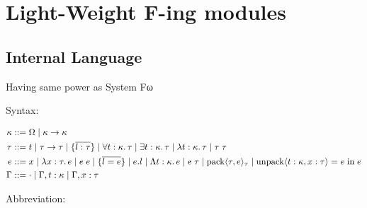 \section{Light-Weight F-ing modules}

\cite{Rossberg:2014}

\subsection{Internal Language}

Having same power as System Fω

Syntax:

\begin{align*}
  \kappa
  &\mathrel{::=} \Omega \mid \kappa \to \kappa
  \\
  \tau
  &\mathrel{::=} t
  \mid \tau \to \tau
  \mid \{\overline{l: \tau}\}
  \mid \forall t: \kappa\ldotp \tau
  \mid \exists t: \kappa\ldotp \tau
  \mid \lambda t: \kappa\ldotp \tau
  \mid \tau\; \tau
  \\
  e
  &\mathrel{::=} x
  \mid \lambda x: \tau\ldotp e
  \mid e\; e
  \mid \{\overline{l = e}\}
  \mid e . l
  \mid \Lambda t: \kappa\ldotp e
  \mid e\; \tau
  \mid \mathop{\mathrm{pack}} \langle \tau, e\rangle_\tau
  \mid \mathop{\mathrm{unpack}} \langle t: \kappa, x: \tau\rangle = e \mathrel{\mathrm{in}} e
  \\
  \Gamma
  &\mathrel{::=} \cdot
  \mid \Gamma, t: \kappa
  \mid \Gamma, x: \tau
\end{align*}

Abbreviation:

